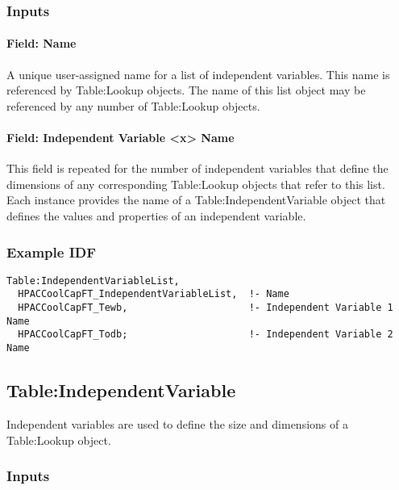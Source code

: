 \subsubsection{Inputs}\label{inputs-1}

\paragraph{Field: Name}\label{field-name-1}

A unique user-assigned name for a list of independent variables. This
name is referenced by Table:Lookup objects. The name of this list object
may be referenced by any number of Table:Lookup objects.

\paragraph{Field: Independent Variable \textless{}x\textgreater{}
Name}\label{field-independent-variable-x-name}

This field is repeated for the number of independent variables that
define the dimensions of any corresponding Table:Lookup objects that
refer to this list. Each instance provides the name of a
Table:IndependentVariable object that defines the values and properties
of an independent variable.

\subsubsection{Example IDF}\label{example-idf-1}

\begin{lstlisting}
Table:IndependentVariableList,
  HPACCoolCapFT_IndependentVariableList,  !- Name
  HPACCoolCapFT_Tewb,                     !- Independent Variable 1 Name
  HPACCoolCapFT_Todb;                     !- Independent Variable 2 Name
\end{lstlisting}

\subsection{Table:IndependentVariable}\label{tableindependentvariable}

Independent variables are used to define the size and dimensions of a
Table:Lookup object.

\subsubsection{Inputs}\label{inputs-2}

